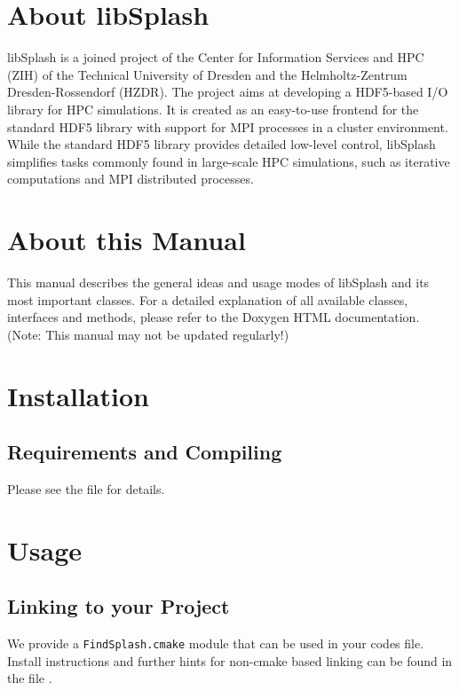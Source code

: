 \documentclass[a4paper,10pt,BCOR12mm]{report}
\newcommand{\code}[1]{\small \texttt{#1}}
\begin{document}
\section{About libSplash}

libSplash is a joined project of the Center for Information Services and HPC (ZIH) of the
Technical University of Dresden and the Helmholtz-Zentrum Dresden-Rossendorf (HZDR).
The project aims at developing a HDF5-based I/O library for HPC simulations.
It is created as an easy-to-use frontend for the standard HDF5 library with support for MPI processes in a cluster environment.
While the standard HDF5 library provides detailed low-level control, libSplash simplifies
tasks commonly found in large-scale HPC simulations, such as iterative computations and MPI distributed processes.

\section{About this Manual}

This manual describes the general ideas and usage modes of libSplash and its most important classes.
For a detailed explanation of all available classes, interfaces and methods, please refer to the
Doxygen HTML documentation.
(Note: This manual may not be updated regularly!)

\newpage

\section{Installation}

\subsection{Requirements and Compiling}

Please see the file  for details.

\section{Usage}

\subsection{Linking to your Project}

We provide a \code{FindSplash.cmake} module that can be used in your codes\newline
{} file. Install instructions and further hints for non-cmake based
linking can be found in the file  .
\end{document}
